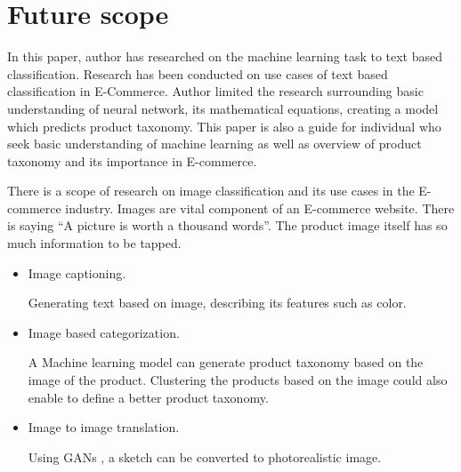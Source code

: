   \section{Future scope}

  In this paper, author has researched on the machine learning task to text based classification. Research has been conducted on use cases of text based classification in E-Commerce. Author limited the research surrounding basic understanding of neural network, its mathematical equations, creating a model which predicts product taxonomy.  This paper is also a guide for individual who seek basic understanding of machine learning as well as overview of product taxonomy and its importance in E-commerce.

  There is a scope of research on image classification and its use cases in the E-commerce industry. Images are vital component of an E-commerce website. There is saying ``A picture is worth a thousand words''. The product image itself has so much information  to be tapped. 

  \begin{itemize}
    \item Image captioning.
    
    Generating text based on image, describing its features such as color.
    
    \item Image based categorization.
    
    A Machine learning model can generate product taxonomy based on the image of the product. Clustering the products based on the image could also enable to define a better product taxonomy. 

    \item Image to image translation.
   
    Using \acfp{GAN} \parencite{Goodfellow.31122016}, a sketch can be converted to photorealistic image. 

    
    

  \end{itemize}